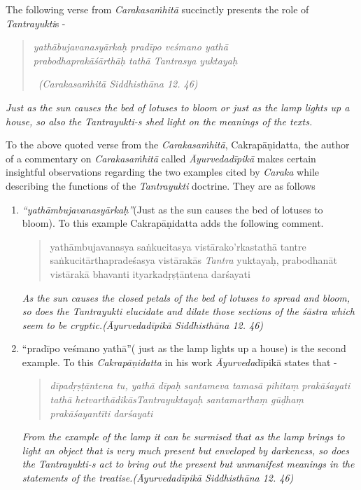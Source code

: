 The following verse from \textit{Carakasaṁhitā} succinctly presents the role of \textit{Tantrayukti}s -

\begin{verse}
\textit{yathābujavanasyārkaḥ pradīpo veśmano yathā}\\\textit{prabodhaprakāśārthāḥ tathā Tantrasya yuktayaḥ }

~\hfill \textit{(Carakasaṁhitā Siddhisthāna 12. 46)}
\end{verse}

\textit{Just as the sun causes the bed of lotuses to bloom or just as the lamp lights up a house, so also the Tantrayukti-s shed light on the meanings of the texts.}

\newpage

To the above quoted verse from the \textit{Carakasaṁhitā}, Cakrapāṇidatta, the author of a commentary on \textit{Carakasaṁhitā} called \textit{Āyurvedadīpikā} makes certain insightful observations regarding the two examples cited by \textit{Caraka} while describing the functions of the \textit{Tantrayukti} doctrine. They are as follows

\begin{enumerate}
\item 
 \textit{“yathāmbujavanasyārkaḥ”}(Just as the sun causes the bed of lotuses to bloom). To this example Cakrapāṇidatta adds the following comment.

\begin{quote}
yathāmbujavanasya saṅkucitasya vistārako'rkastathā tantre saṅkucitārthapradeśasya vistārakās \textit{Tantra} yuktayaḥ, prabodhanāt vistārakā bhavanti ityarkadṛṣṭāntena darśayati
\end{quote}

\begin{myquote}
\textit{As the sun causes the closed petals of the bed of lotuses to spread and bloom, so does the Tantrayukti elucidate and dilate those sections of the śāstra which seem to be cryptic.}\hfill \textit{(Āyurvedadīpikā Siddhisthāna 12. 46)}
\end{myquote}


 \item 
 “pradīpo veśmano yathā”( just as the lamp lights up a house) is the second example. To this \textit{Cakrapāṇidatta} in his work \textit{Āyurveda}dīpikā states that -

\begin{quote}
\textit{dīpadṛṣṭāntena tu, yathā dīpaḥ santameva tamasā pihitaṃ prakāśayati tathā hetvarthādikāsTantrayuktayaḥ santa\-marthaṃ gūḍhaṃ prakāśayantīti darśayati}
\end{quote}

\begin{myquote}
\textit{From the example of the lamp it can be surmised that as the lamp brings to light an object that is very much present but enveloped by darkeness, so does the Tantrayukti-s act to bring out the present but unmanifest meanings in the statements of the treatise.}\hfill \textit{(Āyurvedadīpikā Siddhisthāna 12. 46)}
\end{myquote}


\end{enumerate}

